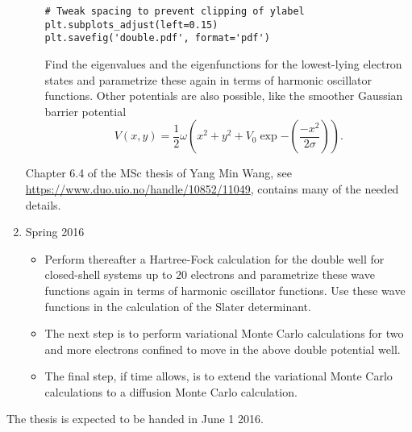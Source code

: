 \documentclass[twocolumn]{revtex4}
\begin{document}
\begin{enumerate}
\begin{itemize}
\begin{verbatim}
# Tweak spacing to prevent clipping of ylabel
plt.subplots_adjust(left=0.15)
plt.savefig('double.pdf', format='pdf')
\end{verbatim}
Find the eigenvalues and the eigenfunctions for the lowest-lying electron states and parametrize these again in terms of harmonic oscillator functions. 
Other potentials are also possible, like the smoother Gaussian barrier potential
\[
V(x,y) = \frac{1}{2}\omega \left(x^2+y^2+V_0\exp{-(\frac{-x^2}{2\sigma})}\right). 
\]
\end{itemize}
Chapter 6.4 of the MSc thesis of Yang Min Wang, see \url{https://www.duo.uio.no/handle/10852/11049}, contains many of the needed details.
\item Spring 2016
\begin{itemize}
\item Perform thereafter a Hartree-Fock calculation for the double well for closed-shell systems up to $20$ electrons
and parametrize these wave functions again in terms of harmonic oscillator functions. Use these wave functions 
in the calculation of the Slater determinant.
 \item The next step is to perform variational Monte Carlo calculations for two and more electrons confined
to move in the above double potential well.
\item The final step, if time allows, is to extend the variational Monte Carlo calculations to a diffusion Monte Carlo calculation. 
\end{itemize}
\end{enumerate}
The thesis is expected to be handed in June 1 2016.
\end{document}
